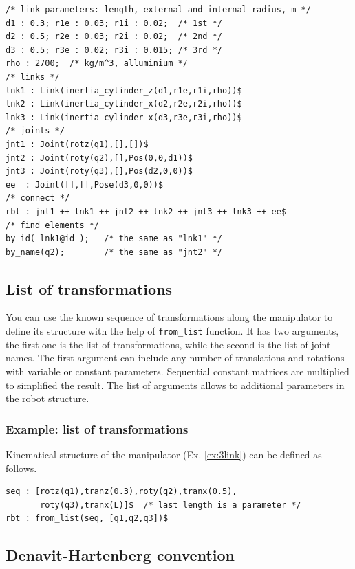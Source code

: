 \documentclass{article}
\begin{document}
\begin{verbatim}
/* link parameters: length, external and internal radius, m */
d1 : 0.3; r1e : 0.03; r1i : 0.02;  /* 1st */
d2 : 0.5; r2e : 0.03; r2i : 0.02;  /* 2nd */
d3 : 0.5; r3e : 0.02; r3i : 0.015; /* 3rd */
rho : 2700;  /* kg/m^3, alluminium */
/* links */
lnk1 : Link(inertia_cylinder_z(d1,r1e,r1i,rho))$
lnk2 : Link(inertia_cylinder_x(d2,r2e,r2i,rho))$
lnk3 : Link(inertia_cylinder_x(d3,r3e,r3i,rho))$
/* joints */
jnt1 : Joint(rotz(q1),[],[])$
jnt2 : Joint(roty(q2),[],Pos(0,0,d1))$
jnt3 : Joint(roty(q3),[],Pos(d2,0,0))$
ee  : Joint([],[],Pose(d3,0,0))$
/* connect */
rbt : jnt1 ++ lnk1 ++ jnt2 ++ lnk2 ++ jnt3 ++ lnk3 ++ ee$
/* find elements */
by_id( lnk1@id );   /* the same as "lnk1" */
by_name(q2);        /* the same as "jnt2" */
\end{verbatim}

\subsection{List of transformations}

You can use the known sequence of transformations along the manipulator to define its structure with the help of \texttt{from\_list} function. It has two arguments, the first one is the list of transformations, while the second is the list of joint names. The first argument can include any number of translations and rotations with variable or constant parameters. Sequential constant matrices are multiplied to simplified the result. The list of arguments allows to additional parameters in the robot structure. 

\subsubsection{Example: list of transformations} 

Kinematical structure of the manipulator (Ex. \ref{ex:3link}) can be defined as follows. 

\begin{verbatim}
seq : [rotz(q1),tranz(0.3),roty(q2),tranx(0.5),
       roty(q3),tranx(L)]$  /* last length is a parameter */
rbt : from_list(seq, [q1,q2,q3])$
\end{verbatim}

\subsection{Denavit-Hartenberg convention}
\end{document}
